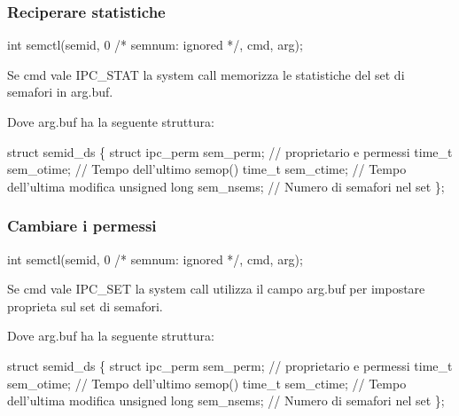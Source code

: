 \subsubsection*{Reciperare statistiche}


\begin{DoxyCode}
\textcolor{keywordtype}{int} semctl(semid, 0 \textcolor{comment}{/* semnum: ignored */}, cmd, arg);
\end{DoxyCode}


Se {\ttfamily cmd} vale {\ttfamily I\+P\+C\+\_\+\+S\+T\+AT} la system call memorizza le statistiche del set di semafori in {\ttfamily arg.\+buf}.

Dove {\ttfamily arg.\+buf} ha la seguente struttura\+:


\begin{DoxyCode}
\textcolor{keyword}{struct }semid\_ds \{
    \textcolor{keyword}{struct }ipc\_perm sem\_perm; \textcolor{comment}{// proprietario e permessi}
    time\_t sem\_otime; \textcolor{comment}{// Tempo dell'ultimo semop()}
    time\_t sem\_ctime; \textcolor{comment}{// Tempo dell'ultima modifica}
    \textcolor{keywordtype}{unsigned} \textcolor{keywordtype}{long} sem\_nsems; \textcolor{comment}{// Numero di semafori nel set}
\};
\end{DoxyCode}


\subsubsection*{Cambiare i permessi}


\begin{DoxyCode}
\textcolor{keywordtype}{int} semctl(semid, 0 \textcolor{comment}{/* semnum: ignored */}, cmd, arg);
\end{DoxyCode}


Se {\ttfamily cmd} vale {\ttfamily I\+P\+C\+\_\+\+S\+ET} la system call utilizza il campo {\ttfamily arg.\+buf} per impostare proprieta\textquotesingle{} sul set di semafori.

Dove {\ttfamily arg.\+buf} ha la seguente struttura\+: 
\begin{DoxyCode}
\textcolor{keyword}{struct }semid\_ds \{
    \textcolor{keyword}{struct }ipc\_perm sem\_perm; \textcolor{comment}{// proprietario e permessi}
    time\_t sem\_otime; \textcolor{comment}{// Tempo dell'ultimo semop()}
    time\_t sem\_ctime; \textcolor{comment}{// Tempo dell'ultima modifica}
    \textcolor{keywordtype}{unsigned} \textcolor{keywordtype}{long} sem\_nsems; \textcolor{comment}{// Numero di semafori nel set}
\};
\end{DoxyCode}


